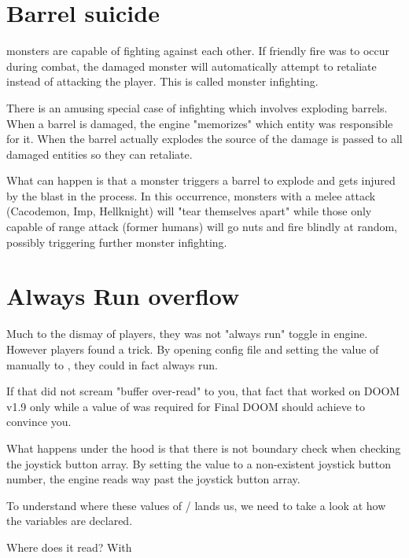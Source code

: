 \section{Barrel suicide}
\doom{} monsters are capable of fighting against each other. If friendly fire was to occur during combat, the damaged monster will automatically attempt to retaliate instead of attacking the player. This is called monster infighting.\\
\par
There is an amusing special case of infighting which involves exploding barrels. When a barrel is damaged, the engine "memorizes" which entity was responsible for it. When the barrel actually explodes the source of the damage is passed to all damaged entities so they can retaliate.\\
\par
What can happen is that a monster triggers a barrel to explode and gets injured by the blast in the process. In this occurrence, monsters with a melee attack (Cacodemon, Imp, Hellknight) will "tear themselves apart" while those only capable of range attack (former humans) will go nuts and fire blindly at random, possibly triggering further monster infighting.









\section{Always Run overflow}
Much to the dismay of players, they was not "always run" toggle in \doom{} engine. However players found a trick. By opening \doom{} config file and setting the value of  manually to , they could in fact always run.\\
\par
If that did not scream "buffer over-read" to you, that fact that  worked on DOOM v1.9 only while a value of  was required for Final DOOM should achieve to convince you.\\
\par 
What happens under the hood is that there is not boundary check when checking the joystick button array. By setting the value to a non-existent joystick button number, the engine reads way past the joystick button array.\\
\par
{}
\par
To understand where these values of / lands us, we need to take a look at how the variables are declared.\\
\par
{}
\par
Where does it read? With \\
\par

